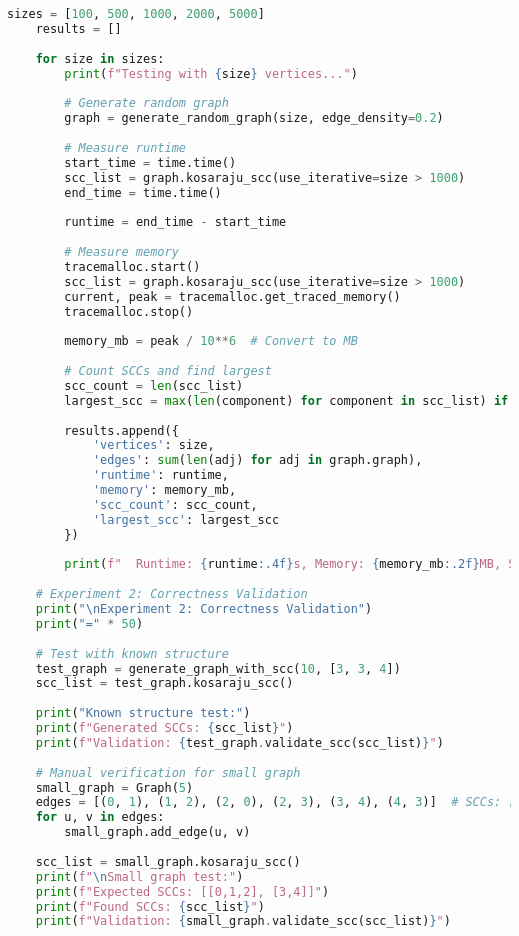 \documentclass{book}
\theoremstyle{definition}
\begin{document}
\begin{lstlisting}[language=Python, caption=Graph Class Structure]
    sizes = [100, 500, 1000, 2000, 5000]
    results = []
    
    for size in sizes:
        print(f"Testing with {size} vertices...")
        
        # Generate random graph
        graph = generate_random_graph(size, edge_density=0.2)
        
        # Measure runtime
        start_time = time.time()
        scc_list = graph.kosaraju_scc(use_iterative=size > 1000)
        end_time = time.time()
        
        runtime = end_time - start_time
        
        # Measure memory
        tracemalloc.start()
        scc_list = graph.kosaraju_scc(use_iterative=size > 1000)
        current, peak = tracemalloc.get_traced_memory()
        tracemalloc.stop()
        
        memory_mb = peak / 10**6  # Convert to MB
        
        # Count SCCs and find largest
        scc_count = len(scc_list)
        largest_scc = max(len(component) for component in scc_list) if scc_list else 0
        
        results.append({
            'vertices': size,
            'edges': sum(len(adj) for adj in graph.graph),
            'runtime': runtime,
            'memory': memory_mb,
            'scc_count': scc_count,
            'largest_scc': largest_scc
        })
        
        print(f"  Runtime: {runtime:.4f}s, Memory: {memory_mb:.2f}MB, SCCs: {scc_count}")
    
    # Experiment 2: Correctness Validation
    print("\nExperiment 2: Correctness Validation")
    print("=" * 50)
    
    # Test with known structure
    test_graph = generate_graph_with_scc(10, [3, 3, 4])
    scc_list = test_graph.kosaraju_scc()
    
    print("Known structure test:")
    print(f"Generated SCCs: {scc_list}")
    print(f"Validation: {test_graph.validate_scc(scc_list)}")
    
    # Manual verification for small graph
    small_graph = Graph(5)
    edges = [(0, 1), (1, 2), (2, 0), (2, 3), (3, 4), (4, 3)]  # SCCs: [0,1,2] and [3,4]
    for u, v in edges:
        small_graph.add_edge(u, v)
    
    scc_list = small_graph.kosaraju_scc()
    print(f"\nSmall graph test:")
    print(f"Expected SCCs: [[0,1,2], [3,4]]")
    print(f"Found SCCs: {scc_list}")
    print(f"Validation: {small_graph.validate_scc(scc_list)}")
    

\end{lstlisting}
\end{document}

